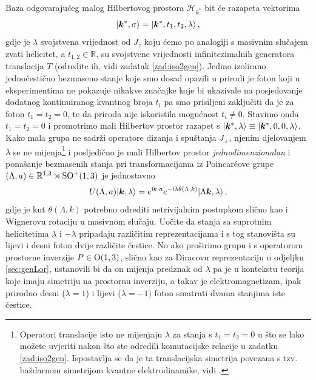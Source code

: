 Baza odgovarajućeg malog Hilbertovog prostora $\mathcal{H}_{k^*}$ bit
će razapeta vektorima
\begin{equation}
  \ket{\vec{k}^{*}, \sigma} = \ket{\vec{k}^{*}, t_1, t_{2}, \lambda} \,,
\end{equation}
gdje je $\lambda$ svojstvena vrijednost od $J_z$ koju ćemo po analogiji
s masivnim slučajem zvati helicitet, a $t_{1,2}\in\mathbb{R}$,
su svojstvene
vrijednosti infinitezimalnih generatora translacija $T$ (odredite ih, vidi
zadatak \ref{zad:iso2gen}).
Jedino izolirano jednočestično bezmaseno stanje koje smo dosad opazili
u prirodi je foton koji u eksperimentima ne pokazuje nikakve značajke
koje bi ukazivale na posjedovanje dodatnog kontinuiranog kvantnog broja
$t_i$ pa smo prisiljeni zaključiti da je za foton $t_1=t_2=0$,
te da priroda nije iskoristila mogućnost $t_i \neq 0$.
Stavimo onda $t_1=t_2=0$ i promotrimo mali Hilbertov prostor
razapet s $\ket{\vec{k}^{*}, \lambda} \equiv \ket{\vec{k}^{*}, 0, 0, \lambda}$.
Kako mala grupa ne sadrži
operatore dizanja i spuštanja $J_{\pm}$, njenim djelovanjem $\lambda$
se ne mijenja\footnote{Operatori translacije isto ne mijenjaju $\lambda$
    za stanja s $t_1=t_2=0$ u što se lako možete uvjeriti nakon što
ste odredili komutacijske relacije u zadatku \ref{zad:iso2gen}.
Ispostavlja se da je ta translacijska simetrija povezana s tzv.
baždarnom simetrijom kvantne elektrodinamike, vidi \cite{Weinberg:1995mt}.}
i posljedično je mali Hilbertov prostor \emph{jednodimenzionalan} i
ponašanje bezmasenih stanja pri
transformacijama iz Poincar\'{e}ove grupe 
$(\Lambda, a) \in \mathbb{R}^{1,3}\rtimes\mathrm{SO}^{+}(1,3)$ je jednostavno
\begin{equation}
    U(\Lambda, a) \ket{\vec{k}, \lambda} = e^{\rmi k\cdot a}
    e^{-\rmi \lambda \theta(\Lambda, k)} \ket{\Lambda\vec{k}, \lambda} \,,
    \label{eq:Urepm0}
\end{equation}
gdje je kut $\theta(\Lambda, k)$ potrebno odrediti netrivijalnim postupkom slično kao
i Wignerovu rotaciju u masivnom slučaju.
Uočite da stanja sa suprotnim helicitetima $\lambda$ i $-\lambda$ pripadaju
različitim reprezentacijama
i s tog stanovišta su lijevi i desni foton dvije različite čestice.
No ako proširimo grupu i s operatorom prostorne inverzije $P\in \mathrm{O}(1,3)$, slično kao za Diracovu
reprezentaciju u odjeljku \ref{sec:genLor}, ustanovili bi da
on mijenja predznak od $\lambda$ pa je u kontekstu teorija koje
imaju simetriju na prostornu inverziju, a takav je elektromagnetizam,
ipak prirodno desni ($\lambda=1$) i lijevi ($\lambda=-1)$ 
foton smatrati dvama stanjima iste čestice.

